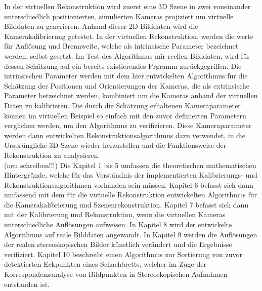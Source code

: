 In der virtuellen Rekonstruktion wird zuerst eine 3D Szene in zwei voneinander unterschiedlich positionierten, simulierten Kameras projiziert um virtuelle Bilddaten zu generieren. Anhand dieser 2D-Bilddaten wird die Kamerakalibrierung getestet. In der virtuellen Rekonstruktion, werden die werte für Auflösung und Brennweite, welche als intrinsische Parameter bezeichnet werden, selbst gesetzt. Im Test des Algorithmus mir reellen Bilddaten, wird für dessen Schätzung auf ein bereits existierendes Prgramm zurückgegriffen. Die intrinsischen Parameter werden mit dem hier entwickelten Algorithmus für die Schätzung der Positionen und Orientierungen der Kameras, die als extrinsische Parameter betzeichnet werden, kombiniert um die Kameras anhand der virtuellen Daten zu kalibrieren. Die durch die Schätzung erhaltenen Kameraparameter können im virtuellen Beispiel so einfach mit den zuvor definierten Parametern verglichen werden, um den Algorithmus zu verifizieren. Diese Kameraparameter werden dann entwickelten Rekonstruktionsalgorithmus dazu verwendet, in die Ursprüngliche 3D-Szene wieder herzustellen und die Funktionsweise der Rekonstruktion zu analysieren. \\


(neu schreiben!!!)
Die Kapitel 1 bis 5 umfassen die theoretischen mathematischen Hintergründe, welche für das Verständnis der implementierten Kalibrierungs- und Rekonstruktionsalgorithmen vorhanden sein müssen. Kapitel 6 befasst sich dann umfassend mit dem für die virtuelle Rekonstruktion entwickelten Algorithmus für die Kamerakalibrierung und Szenenrekonstruktion. Kapitel 7 befasst sich dann mit der Kalibrierung und Rekonstruktion, wenn die virtuellen Kameras unterschiedliche Auflösungen aufweisen. In Kapitel 8 wird der entwickelte Algorithmus auf reale Bilddaten angewandt. In Kapitel 9 werden die Auflösungen der realen stereoskopischen Bilder künstlich verändert und die Ergebnisse verifiziert. Kapitel 10 beschreibt einen Algorithmus zur Sortierung von zuvor detektierten Eckpunkten eines Schachbretts, welcher im Zuge der Korrespondenzanalyse von Bildpunkten in Stereoskopischen Aufnahmen entstanden ist.

